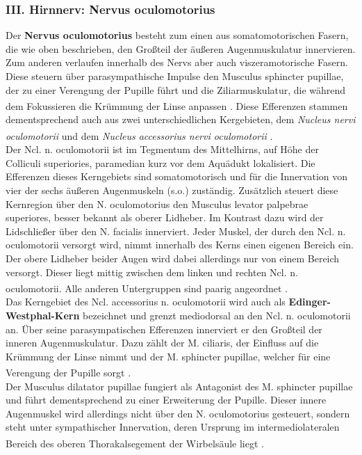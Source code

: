 \documentclass[12pt,a4paper,pdftex]{article}
\begin{document}
\subsubsection*{III. Hirnnerv: Nervus oculomotorius} 
Der \textbf{Nervus oculomotorius} besteht zum einen aus somatomotorischen Fasern, die wie oben beschrieben, den Großteil der äußeren Augenmuskulatur innervieren. Zum anderen verlaufen innerhalb des Nervs aber auch viszeramotorische Fasern. Diese steuern über parasympathische Impulse den Musculus sphincter pupillae, der zu einer Verengung der Pupille führt und die Ziliarmuskulatur, die während dem Fokussieren die Krümmung der Linse anpassen \textsuperscript{\cite[39]{kandel2013principles}}. Diese Efferenzen stammen dementsprechend auch aus zwei unterschiedlichen Kergebieten, dem \textit{Nucleus nervi oculomotorii}   und dem \textit{Nucleus accessorius nervi oculomotorii}  \textsuperscript{\cite[5]{trepel2011neuroanatomie}}. \\  
Der Ncl. n. oculomotorii ist im Tegmentum des Mittelhirns, auf Höhe der Colliculi superiories, paramedian kurz vor dem Aquädukt lokalisiert. Die Efferenzen dieses Kerngebiets sind somatomotorisch und für die Innervation von vier der sechs äußeren Augenmuskeln (s.o.) zuständig. Zusätzlich steuert diese Kernregion über den N. oculomotorius den Musculus levator palpebrae superiores, besser bekannt als oberer Lidheber. Im Kontrast dazu wird der Lidschließer über den N. facialis innerviert. Jeder Muskel, der durch den Ncl. n. oculomotorii versorgt wird, nimmt innerhalb des Kerns einen eigenen Bereich ein. Der obere Lidheber beider Augen wird dabei allerdings nur von einem Bereich versorgt. Dieser liegt mittig zwischen dem linken und rechten Ncl. n. oculomotorii. Alle anderen Untergruppen sind paarig angeordnet \textsuperscript{\cite[5]{trepel2011neuroanatomie}}. \\
Das Kerngebiet des Ncl. accessorius n. oculomotorii wird auch als \textbf{Edinger-Westphal-Kern} bezeichnet und grenzt mediodorsal an den Ncl. n. oculomotorii an. Über seine parasympatischen Efferenzen innerviert er den Großteil der inneren Augenmuskulatur. Dazu zählt der M. ciliaris, der Einfluss auf die Krümmung der Linse nimmt und der M. sphincter pupillae, welcher für eine Verengung der Pupille sorgt \textsuperscript{\cite[5]{trepel2011neuroanatomie}}. \\          
Der Musculus dilatator pupillae fungiert als Antagonist des M. sphincter pupillae und führt dementsprechend zu einer Erweiterung der Pupille. Dieser innere Augenmuskel wird allerdings nicht über den N. oculomotorius gesteuert, sondern steht unter sympathischer Innervation, deren Ursprung im intermediolateralen Bereich des oberen Thorakalsegement der Wirbelsäule liegt \textsuperscript{\cite[39]{kandel2013principles}}.
\end{document}
